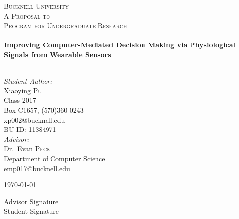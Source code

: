 \begin{titlepage}
\begin{center}


\textsc{\LARGE Bucknell University}\\[1.5cm]
\textsc{\large A Proposal to}\\[0.5cm]
\textsc{\Large  Program for Undergraduate Research}\\[0.5cm]

\HRule \\[0.4cm]
{ \huge \bfseries Improving Computer-Mediated Decision Making via Physiological Signals from Wearable Sensors \\[0.4cm] }

\HRule \\[1.5cm]

\emph{Student Author:}\\
Xiaoying \textsc{Pu}\\
Class 2017\\
Box C1657, (570)360-0243\\
xp002@bucknell.edu\\
BU ID: 11384971\\


\vspace{10pt}
\emph{Advisor:} \\
Dr.~Evan \textsc{Peck}\\
Department of Computer Science\\
emp017@bucknell.edu

\vfill

{\large \today}
\vspace{40pt}
\end{center}
{\large Advisor Signature \underline{\hspace{5cm}} \vspace{20pt} }\\
{\large Student Signature \underline{\hspace{5cm}}}

\end{titlepage}